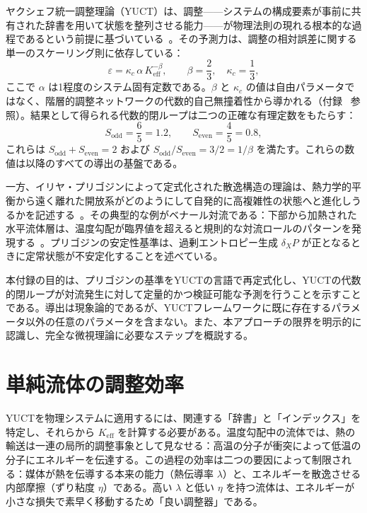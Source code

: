 \documentclass[12pt,a4paper]{article}
\begin{document}
	ヤクシェフ統一調整理論（YUCT）は、調整——システムの構成要素が事前に共有された辞書を用いて状態を整列させる能力——が物理法則の現れる根本的な過程であるという前提に基づいている~\cite{Yakushev2026}。その予測力は、調整の相対誤差に関する単一のスケーリング則に依存している：
	\begin{equation}\label{eq:universal}
		\varepsilon = \kappa_c\,\alpha\, K_{\mathrm{eff}}^{-\beta},\qquad 
		\beta = \frac{2}{3},\quad \kappa_c = \frac{1}{3},
	\end{equation}
	ここで \(\alpha\) は1程度のシステム固有定数である。\(\beta\) と \(\kappa_c\) の値は自由パラメータではなく、階層的調整ネットワークの代数的自己無撞着性から導かれる（付録~\cite{AppendixY, AppendixL, AppendixFerra, AppendixAF} 参照）。結果として得られる代数的閉ループは二つの正確な有理定数をもたらす：
	\begin{equation}\label{eq:S-constants}
		S_{\mathrm{odd}} = \frac{6}{5} = 1.2,\qquad
		S_{\mathrm{even}} = \frac{4}{5} = 0.8,
	\end{equation}
	これらは \(S_{\mathrm{odd}} + S_{\mathrm{even}} = 2\) および \(S_{\mathrm{odd}}/S_{\mathrm{even}} = 3/2 = 1/\beta\) を満たす。これらの数値は以降のすべての導出の基盤である。
	
	一方、イリヤ・プリゴジンによって定式化された散逸構造の理論は、熱力学的平衡から遠く離れた開放系がどのようにして自発的に高複雑性の状態へと進化しうるかを記述する~\cite{Prigogine1977, Glansdorff1971}。その典型的な例がベナール対流である：下部から加熱された水平流体層は、温度勾配が臨界値を超えると規則的な対流ロールのパターンを発現する~\cite{Chandrasekhar1961}。プリゴジンの安定性基準は、過剰エントロピー生成 \(\delta_X P\) が正となるときに定常状態が不安定化することを述べている。
	
	本付録の目的は、プリゴジンの基準をYUCTの言語で再定式化し、YUCTの代数的閉ループが対流発生に対して定量的かつ検証可能な予測を行うことを示すことである。導出は現象論的であるが、YUCTフレームワークに既に存在するパラメータ以外の任意のパラメータを含まない。また、本アプローチの限界を明示的に認識し、完全な微視理論に必要なステップを概説する。
	
	\section{単純流体の調整効率}
	
	YUCTを物理システムに適用するには、関連する「辞書」と「インデックス」を特定し、それらから \(K_{\mathrm{eff}}\) を計算する必要がある。温度勾配中の流体では、熱の輸送は一連の局所的調整事象として見なせる：高温の分子が衝突によって低温の分子にエネルギーを伝達する。この過程の効率は二つの要因によって制限される：媒体が熱を伝導する本来の能力（熱伝導率 \(\lambda\)）と、エネルギーを散逸させる内部摩擦（ずり粘度 \(\eta\)）である。高い \(\lambda\) と低い \(\eta\) を持つ流体は、エネルギーが小さな損失で素早く移動するため「良い調整器」である。
	
\end{document}
